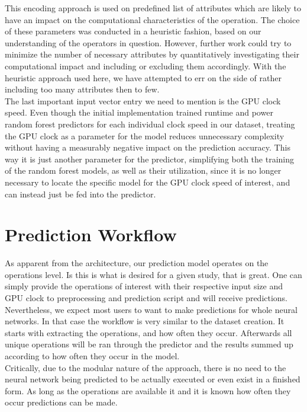 This encoding approach is used on predefined list of attributes which are likely to have an impact on the computational characteristics of the operation. The choice of these parameters was conducted in a heuristic fashion, based on our understanding of the operators in question. However, further work could try to minimize the number of necessary attributes by quantitatively investigating their computational impact and including or excluding them accordingly. With the heuristic approach used here, we have attempted to err on the side of rather including too many attributes then to few. \\
The last important input vector entry we need to mention is the GPU clock speed. Even though the initial implementation trained runtime and power random forest predictors for each individual clock speed in our dataset, treating the GPU clock as a parameter for the model reduces unnecessary complexity without having a measurably negative impact on the prediction accuracy. This way it is just another parameter for the predictor, simplifying both the training of the random forest models, as well as their utilization, since it is no longer necessary to locate the specific model for the GPU clock speed of interest, and can instead just be fed into the predictor.


\section{Prediction Workflow}
As apparent from the architecture, our prediction model operates on the operations level. Is this is what is desired for a given study, that is great. One can simply provide the operations of interest with their respective input size and GPU clock to preprocessing and prediction script and will receive predictions. \\
Nevertheless, we expect most users to want to make predictions for whole neural networks. In that case the workflow is very similar to the dataset creation. It starts with extracting the operations, and how often they occur. Afterwards all unique operations will be ran through the predictor and the results summed up according to how often they occur in the model.\\
Critically, due to the modular nature of the approach, there is no need to the neural network being predicted to be actually executed or even exist in a finished form. As long as the operations are available it and it is known how often they occur predictions can be made. 